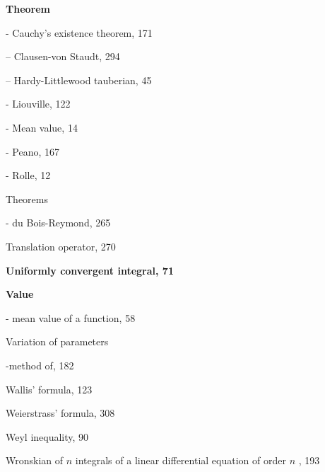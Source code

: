 \par\noindent\textbf{Theorem}\par

- Cauchy's existence theorem, 171

-- Clausen-von Staudt, 294

-- Hardy-Littlewood tauberian, 45

- Liouville, 122

- Mean value, 14

- Peano, 167

- Rolle, 12

Theorems

- du Bois-Reymond, 265

Translation operator, 270

\par\noindent\textbf{Uniformly convergent integral, 71}\par

\par\noindent\textbf{Value}\par

- mean value of a function, 58

Variation of parameters

-method of, 182

Wallis' formula, 123

Weierstrass' formula, 308

Weyl inequality, 90

Wronskian of \(n\) integrals of a linear differential equation of order \(n\) , 193
